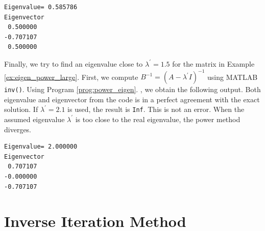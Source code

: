 {\begin{example}
\small
\begin{mybox}
	\begin{Verbatim}
Eigenvalue= 0.585786 
Eigenvector
 0.500000
-0.707107
 0.500000
   \end{Verbatim}
\end{mybox}
\normalsize
\end{example}

\bigskip
\begin{example}\label{ex:eigen_power_middle}

Finally, we try to find an eigenvalue close to $\lambda^\prime=1.5$ for the matrix in Example \ref{ex:eigen_power_large}.
First, we compute $B^{-1} = (A-\lambda^\prime I)^{-1}$ using MATLAB \texttt{inv()}.  Using Program \ref{prog:power_eigen}. , we obtain the following output. 
Both eigenvalue and eigenvector from the code is in a perfect agreement with the exact solution.
If $\lambda^\prime=2.1$ is used, the result is \texttt{Inf}.  This is not an error.  When the assumed eigenvalue $\lambda^\prime$ is too close to the real eigenvalue, the power method diverges.

\small
\begin{mybox}
\begin{Verbatim}[frame=single]
Eigenvalue= 2.000000 
Eigenvector
 0.707107
-0.000000
-0.707107
\end{Verbatim}
\normalsize
\end{mybox}
\end{example}

\noindent
\section{Inverse Iteration Method}

}
